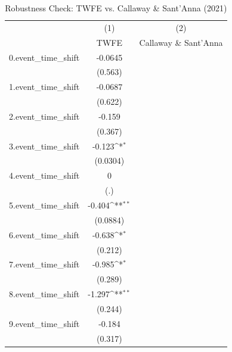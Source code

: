 \begin{table}[htbp]\centering
\def\sym#1{\ifmmode^{#1}\else\(^{#1}\)\fi}
\caption{Robustness Check: TWFE vs. Callaway \& Sant'Anna (2021)}
\begin{tabular}{l*{2}{c}}
\toprule
            &\multicolumn{1}{c}{(1)}&\multicolumn{1}{c}{(2)}\\
            &\multicolumn{1}{c}{TWFE}&\multicolumn{1}{c}{Callaway \& Sant'Anna}\\
\midrule
0.event\_time\_shift&     -0.0645         &                     \\
            &     (0.563)         &                     \\
\addlinespace
1.event\_time\_shift&     -0.0687         &                     \\
            &     (0.622)         &                     \\
\addlinespace
2.event\_time\_shift&      -0.159         &                     \\
            &     (0.367)         &                     \\
\addlinespace
3.event\_time\_shift&      -0.123\sym{*}  &                     \\
            &    (0.0304)         &                     \\
\addlinespace
4.event\_time\_shift&           0         &                     \\
            &         (.)         &                     \\
\addlinespace
5.event\_time\_shift&      -0.404\sym{**} &                     \\
            &    (0.0884)         &                     \\
\addlinespace
6.event\_time\_shift&      -0.638\sym{*}  &                     \\
            &     (0.212)         &                     \\
\addlinespace
7.event\_time\_shift&      -0.985\sym{*}  &                     \\
            &     (0.289)         &                     \\
\addlinespace
8.event\_time\_shift&      -1.297\sym{**} &                     \\
            &     (0.244)         &                     \\
\addlinespace
9.event\_time\_shift&      -0.184         &                     \\
            &     (0.317)         &                     \\

\end{tabular}
\end{table}
